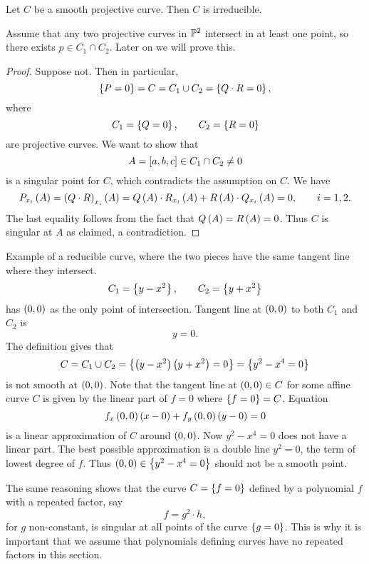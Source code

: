 \pagebreak

\begin{theorem}
\label{thm:7.9}
Let $ C $ be a smooth projective curve. Then $ C $ is irreducible.
\end{theorem}

Assume that any two projective curves in $ \P^2 $ intersect in at least one point, so there exists $ p \in C_1 \cap C_2 $. Later on we will prove this.

\begin{proof}
Suppose not. Then in particular,
$$ \cb{P = 0} = C = C_1 \cup C_2 = \cb{Q \cdot R = 0}, $$
where
$$ C_1 = \cb{Q = 0}, \qquad C_2 = \cb{R = 0} $$
are projective curves. We want to show that
$$ A = \sb{a, b, c} \in C_1 \cap C_2 \ne 0 $$
is a singular point for $ C $, which contradicts the assumption on $ C $. We have
$$ P_{x_i}\rb{A} = \rb{Q \cdot R}_{x_i}\rb{A} = Q\rb{A} \cdot R_{x_i}\rb{A} + R\rb{A} \cdot Q_{x_i}\rb{A} = 0, \qquad i = 1, 2. $$
The last equality follows from the fact that $ Q\rb{A} = R\rb{A} = 0 $. Thus $ C $ is singular at $ A $ as claimed, a contradiction.
\end{proof}


\begin{example*}
Example of a reducible curve, where the two pieces have the same tangent line where they intersect.
$$ C_1 = \cb{y - x^2}, \qquad C_2 = \cb{y + x^2} $$
has $ \rb{0, 0} $ as the only point of intersection. Tangent line at $ \rb{0, 0} $ to both $ C_1 $ and $ C_2 $ is
$$ y = 0. $$
The definition gives that
$$ C = C_1 \cup C_2 = \cb{\rb{y - x^2}\rb{y + x^2} = 0} = \cb{y^2 - x^4 = 0} $$
is not smooth at $ \rb{0, 0} $. Note that the tangent line at $ \rb{0, 0} \in C $ for some affine curve $ C $ is given by the linear part of $ f = 0 $ where $ \cb{f = 0} = C $. Equation
$$ f_x\rb{0, 0}\rb{x - 0} + f_y\rb{0, 0}\rb{y - 0} = 0 $$
is a linear approximation of $ C $ around $ \rb{0, 0} $. Now $ y^2 - x^4 = 0 $ does not have a linear part. The best possible approximation is a double line $ y^2 = 0 $, the term of lowest degree of $ f $. Thus $ \rb{0, 0} \in \cb{y^2 - x^4 = 0} $ should not be a smooth point.
\end{example*}

\begin{remark}
The same reasoning shows that the curve $ C = \cb{f = 0} $ defined by a polynomial $ f $ with a repeated factor, say
$$ f = g^2 \cdot h, $$
for $ g $ non-constant, is singular at all points of the curve $ \cb{g = 0} $. This is why it is important that we assume that polynomials defining curves have no repeated factors in this section.
\end{remark}

